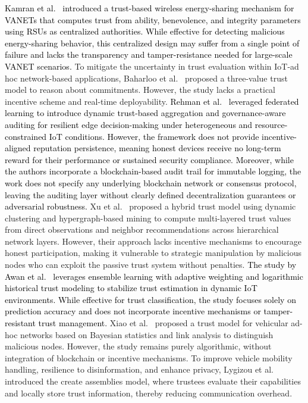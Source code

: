 \cite{cho2010survey}\documentclass[journal,comsoc,twoside]{IEEEtran}
\begin{document}
\textcolor{black}{Kamran et al.~\cite{awan2021vtrust} introduced a trust-based wireless energy-sharing mechanism for VANETs that computes trust from ability, benevolence, and integrity parameters using RSUs as centralized authorities. While effective for detecting malicious energy-sharing behavior, this centralized design may suffer from a single point of failure and lacks the transparency and tamper-resistance needed for large-scale VANET scenarios.}
To mitigate the uncertainty in trust evaluation within IoT-ad hoc network-based applications, Baharloo et al.~\cite{baharloo} proposed a three-value trust model to reason about commitments. However, the study lacks a practical incentive scheme and real-time deployability.
\textcolor{black}{
Rehman et al.~\cite{Rehman} leveraged federated learning to introduce dynamic trust-based aggregation and governance-aware auditing for resilient edge decision-making under heterogeneous and resource-constrained IoT conditions. However, the framework does not provide incentive-aligned reputation persistence, meaning honest devices receive no long-term reward for their performance or sustained security compliance. Moreover, while the authors incorporate a blockchain-based audit trail for immutable logging, the work does not specify any underlying blockchain network or consensus protocol, leaving the auditing layer without clearly defined decentralization guarantees or adversarial robustness.}
Xu et al.~\cite{xu} proposed a hybrid trust model using dynamic clustering and hypergraph-based mining to compute multi-layered trust values from direct observations and neighbor recommendations across hierarchical network layers. However, their approach lacks incentive mechanisms to encourage honest participation, making it vulnerable to strategic manipulation by malicious nodes who can exploit the passive trust system without penalties. \textcolor{black}{The study by Awan et al.~\cite{stacktrust} leverages ensemble learning with adaptive weighting and logarithmic historical trust modeling to stabilize trust estimation in dynamic IoT environments. While effective for trust classification, the study focuses solely on prediction accuracy and does not incorporate incentive mechanisms or tamper-resistant trust management.}
Xiao et al.~\cite{Xiao} proposed a trust model for vehicular ad-hoc networks based on Bayesian statistics and link analysis to distinguish malicious nodes. However, the study remains purely algorithmic, without integration of blockchain or incentive mechanisms. 
To improve vehicle mobility handling, resilience to disinformation, and enhance privacy, Lygizou et al.~\cite{lygizou} introduced the create assemblies model, where trustees evaluate their capabilities and locally store trust information, thereby reducing communication overhead.
\end{document}
